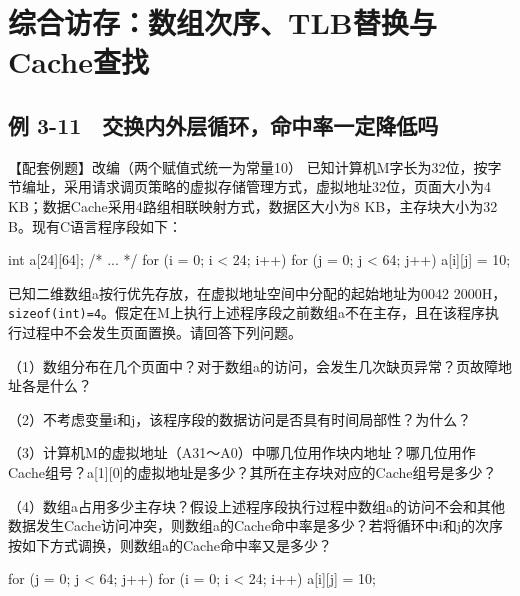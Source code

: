 \section{综合访存：数组次序、TLB替换与Cache查找}\label{CO03-28}

\subsection{例 3-11　交换内外层循环，命中率一定降低吗}\label{CO03-29}

\begin{example}[配套例题]

【配套例题】改编（两个赋值式统一为常量10） 已知计算机M字长为32位，按字节编址，采用请求调页策略的虚拟存储管理方式，虚拟地址32位，页面大小为4 KB；数据Cache采用4路组相联映射方式，数据区大小为8 KB，主存块大小为32 B。现有C语言程序段如下：

\par\medskip\noindent\begin{minipage}{\linewidth}
\begin{codeblock}[language=C]
int a[24][64];
/* ... */
for (i = 0; i < 24; i++)
    for (j = 0; j < 64; j++) a[i][j] = 10;
\end{codeblock}
\end{minipage}\par\medskip

已知二维数组a按行优先存放，在虚拟地址空间中分配的起始地址为0042 2000H，\texttt{sizeof(\allowbreak{}int)\allowbreak{}=\allowbreak{}4}。假定在M上执行上述程序段之前数组a不在主存，且在该程序执行过程中不会发生页面置换。请回答下列问题。

（1）数组分布在几个页面中？对于数组a的访问，会发生几次缺页异常？页故障地址各是什么？

（2）不考虑变量i和j，该程序段的数据访问是否具有时间局部性？为什么？

（3）计算机M的虚拟地址（A31～A0）中哪几位用作块内地址？哪几位用作Cache组号？a{[}1{]}{[}0{]}的虚拟地址是多少？其所在主存块对应的Cache组号是多少？

（4）数组a占用多少主存块？假设上述程序段执行过程中数组a的访问不会和其他数据发生Cache访问冲突，则数组a的Cache命中率是多少？若将循环中i和j的次序按如下方式调换，则数组a的Cache命中率又是多少？

\par\medskip\noindent\begin{minipage}{\linewidth}
\begin{codeblock}[language=C]
for (j = 0; j < 64; j++)
    for (i = 0; i < 24; i++) a[i][j] = 10;
\end{codeblock}
\end{minipage}\par\medskip

\end{example}

